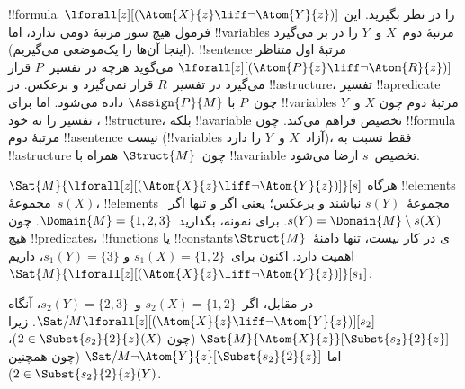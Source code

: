\documentclass[../../../include/open-logic-section]{subfiles}
\begin{document}
\begin{ex}
  !!{formula}~$\lforall[z][(\Atom{X}{z} \liff \lnot
    \Atom{Y}{z})]$ را در نظر بگیرید. این فرمول هیچ سور مرتبهٔ دومی
  ندارد، اما !!{variable}s مرتبهٔ دوم~$X$ و~$Y$ را در بر می‌گیرد
  (اینجا آن‌ها را یک‌موضعی می‌گیریم). !!{sentence} مرتبهٔ اول متناظر
  $\lforall[z][(\Atom{P}{z} \liff \lnot \Atom{R}{z})]$ می‌گوید هرچه
  در تفسیر~$P$ قرار می‌گیرد در تفسیر~$R$ قرار نمی‌گیرد و برعکس. در
  !!a{structure}، تفسیر !!a{predicate} چون~$P$ با
  $\Assign{P}{M}$ داده می‌شود. اما برای !!{variable}s مرتبهٔ دوم چون
  $X$ و~$Y$، تفسیر را نه خود !!{structure}، بلکه !!a{variable} تخصیص
  فراهم می‌کند. چون !!{formula} مرتبهٔ دوم !!a{sentence} نیست
  (!!{variable}s آزاد~$X$ و~$Y$ را دارد)، فقط نسبت به !!a{structure}
  چون~$\Struct{M}$ همراه با !!a{variable} تخصیص~$s$ ارضا می‌شود.

  $\Sat{M}{\lforall[z][(\Atom{X}{z} \liff \lnot \Atom{Y}{z})]}[s]$
  هرگاه !!{element}s مجموعهٔ~$s(X)$، !!{element}s مجموعهٔ~$s(Y)$
  نباشند و برعکس؛ یعنی اگر و تنها اگر~$s(Y) = \Domain{M} \setminus
  s(X)$. برای نمونه، بگذارید~$\Domain{M} = \{1, 2, 3\}$. چون هیچ
  !!{predicate}s، !!{function}s یا !!{constant}sی در کار نیست، تنها
  دامنهٔ~$\Struct{M}$ اهمیت دارد. اکنون برای~$s_1(X) = \{1, 2\}$ و
  $s_1(Y) = \{3\}$، داریم~$\Sat{M}{\lforall[z][(\Atom{X}{z}
      \liff \lnot \Atom{Y}{z})]}[s_1]$.

  در مقابل، اگر~$s_2(X) = \{1, 2\}$ و~$s_2(Y) = \{2, 3\}$، آنگاه
  $\Sat/{M}{\lforall[z][(\Atom{X}{z} \liff \lnot
      \Atom{Y}{z})]}[s_2]$. زیرا
  $\Sat{M}{\Atom{X}{z}}[\Subst{s_2}{2}{z}]$ (چون
  $2 \in \Subst{s_2}{2}{z}(X)$)، اما
  $\Sat/{M}{\lnot \Atom{Y}{z}}[\Subst{s_2}{2}{z}]$ (چون همچنین
  $2 \in \Subst{s_2}{2}{z}(Y)$).
\end{ex}
\end{document}
